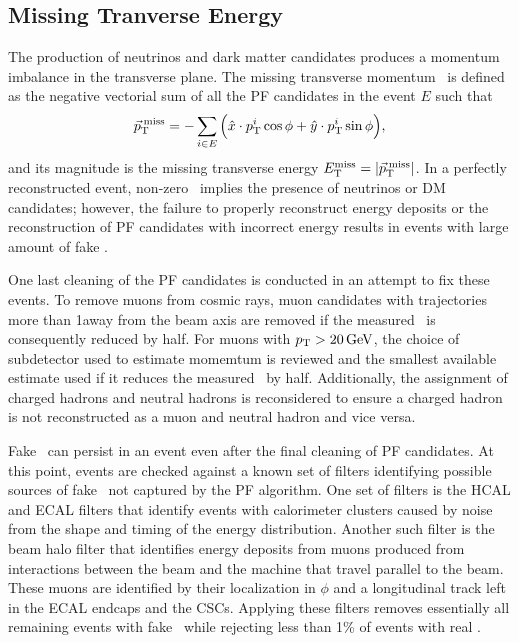 \subsection{Missing Tranverse Energy}
\label{sec:pf_met}

The production of neutrinos and dark matter candidates produces a momentum imbalance in the transverse plane.
The missing transverse momentum \ptvecmiss\ is defined as the negative vectorial sum of all the PF candidates in the event $E$ such that
\begin{equation}
  {\vec p}_{\mathrm{T}}^{\kern2pt\text{miss}} = - \sum_{i\in E} \Big( \hat x \cdot p_{\mathrm{T}}^i \cos \phi + \hat y \cdot p_{\mathrm{T}}^i \sin \phi \Big),
\end{equation}
and its magnitude is the missing transverse energy $E_{\mathrm{T}}^{\text{miss}} = \lvert {\vec p}_{\mathrm{T}}^{\kern2pt\text{miss}} \rvert$.
In a perfectly reconstructed event, non-zero \met\ implies the presence of neutrinos or DM candidates; however, the failure to properly reconstruct energy deposits or the reconstruction of PF candidates with incorrect energy results in events with large amount of fake \met.

One last cleaning of the PF candidates is conducted in an attempt to fix these events.
To remove muons from cosmic rays, muon candidates with trajectories more than 1\cm away from the beam axis are removed if the measured \met\ is consequently reduced by half. 
For muons with $p_{\mathrm{T}} > 20\,\text{Ge\hspace{-.08em}V}$, the choice of subdetector used to estimate momemtum is reviewed and the smallest available estimate used if it reduces the measured \met\ by half. 
Additionally, the assignment of charged hadrons and neutral hadrons is reconsidered to ensure a charged hadron is not reconstructed as a muon and neutral hadron and vice versa.

Fake \met\ can persist in an event even after the final cleaning of PF candidates.
At this point, events are checked against a known set of filters identifying possible sources of fake \met\ not captured by the PF algorithm.
One set of filters is the HCAL and ECAL filters that identify events with calorimeter clusters caused by noise from the shape and timing of the energy distribution.
Another such filter is the beam halo filter that identifies energy deposits from muons produced from interactions between the beam and the machine that travel parallel to the beam. These muons are identified by their localization in $\phi$ and a longitudinal track left in the ECAL endcaps and the CSCs.
Applying these filters removes essentially all remaining events with fake \met\ while rejecting less than 1\% of events with real \met.

